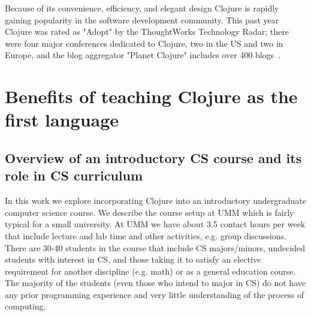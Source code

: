 \documentclass[submission,copyright,creativecommons]{eptcs}
\newcommand{\allcomments}[1]{{#1}}
\newcommand{\elenacomment}[1]{{\bf \textcolor{ForestGreen}{\allcomments{{#1}}}}}
\newcommand{\stephencomment}[1]{{\bf \color{StephensBlue}{\allcomments{{#1}}}}} %
\newcommand{\joecomment}[1]{{\bf \color{JoesGold}{\allcomments{{#1}}}}}
\begin{document}
Because of its convenience, efficiency, and elegant design 
Clojure is rapidly gaining popularity in the software development community. This past year Clojure was rated as "Adopt" by the ThoughtWorks Technology Radar; there were four major conferences dedicated to Clojure, two in the US and two in Europe, and the blog aggregator "Planet Clojure" includes over 400 blogs~\cite{clojure:review}. 

\section{Benefits of teaching Clojure as the first language}\label{sec:benefits}

\subsection{Overview of an introductory CS course and its role in CS curriculum}
In this work we explore incorporating Clojure into an introductory undergraduate computer science course. We describe the course setup at UMM which is fairly typical for a small university. At UMM we have about 3.5 contact hours per week that include lecture and lab time and other activities, e.g. group discussions. There are 30-40 students in the course that  include CS majors/minors, undecided students with  interest in CS, and those taking it to satisfy an elective requirement for another discipline (e.g. math) or as a general education course. The majority of the students (even those who intend to major in CS) do not have any prior programming experience and very little understanding of the process of computing. 
\end{document}
